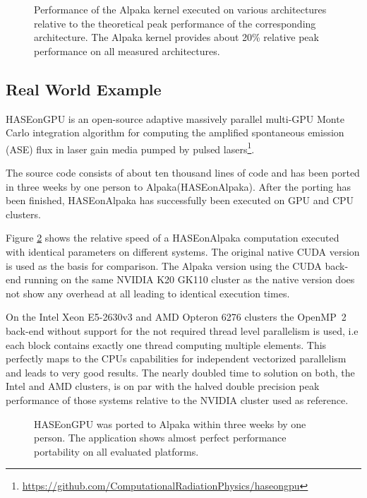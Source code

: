 \documentclass[10pt, twocolumn]{article}
\newcommand{\alpaka}{Alpaka\xspace}
\newcommand{\cuda}{{CUDA}\xspace}
\newcommand{\openmp}{{OpenMP}\xspace}
\newcommand{\nvidia}{{NVIDIA}\xspace}
\newcommand{\intel}{{Intel}\xspace}
\newcommand{\amd}{{AMD}\xspace}
\begin{document}
\begin{figure}[tb]
  \centerline
      {}
      \caption{Performance of the \alpaka kernel executed on various architectures relative to the theoretical peak performance of the corresponding architecture.
        The \alpaka kernel provides about 20\% relative peak performance on all measured architectures.}
      \label{fig:performance_portability}
      \vspace{-1em}
\end{figure}


\subsection{Real World Example}
 HASEonGPU is an open-source adaptive massively parallel multi-GPU Monte Carlo integration algorithm for computing the amplified spontaneous emission (ASE) flux in laser gain media pumped by pulsed lasers\footnote{\url{https://github.com/ComputationalRadiationPhysics/haseongpu}}.

The source code consists of about ten thousand lines of code and has been ported in three weeks by one person to \alpaka (HASEonAlpaka).
After the porting has been finished, HASEonAlpaka has successfully been executed on GPU and CPU clusters.

Figure \ref{graphic:haseongpu} shows the relative speed of a HASEonAlpaka computation executed with identical parameters on different systems.
The original native CUDA version is used as the basis for comparison.
The \alpaka version using the \cuda back-end running on the same \nvidia K20 GK110 cluster as the native version does not show any overhead at all leading to identical execution times.

On the \intel Xeon E5-2630v3 and \amd Opteron 6276 clusters the \openmp~2  back-end without support for the not required thread level parallelism is used, i.e each block contains exactly one thread computing multiple elements.
This perfectly maps to the CPUs capabilities for independent vectorized parallelism and leads to very good results.
The nearly doubled time to solution on both, the \intel and \amd clusters, is on par with the halved double precision peak performance of those systems relative to the \nvidia cluster used as reference.

\begin{figure}[th]
  \centerline
      {}
  \caption{HASEonGPU was ported to \alpaka within three weeks by one person. The application shows almost perfect performance portability on all evaluated platforms.}
  \label{graphic:haseongpu}
        \vspace{-1em}
\end{figure}
\end{document}
